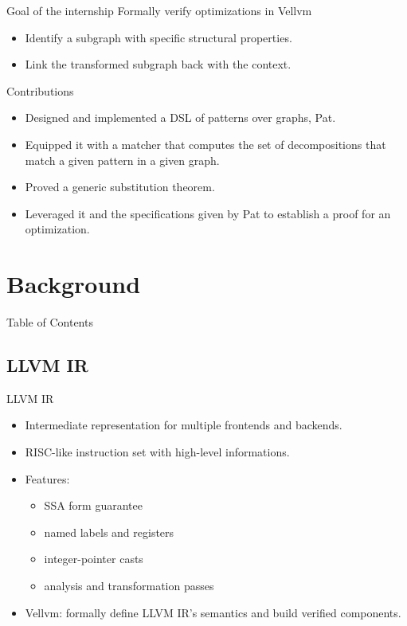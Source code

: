 \documentclass{beamer}
\newcommand{\leon}[1]{\textcolor{blue}{#1}}
\begin{document}
\begin{frame}
  \begin{block}{Goal of the internship}
    Formally verify optimizations in Vellvm
  \end{block}
  \begin{itemize}
    \item Identify a subgraph with specific structural properties.
    \item Link the transformed subgraph back with the context.
  \end{itemize}
\end{frame}

\begin{frame}{Contributions}
  \begin{itemize}
    \item Designed and implemented a DSL of patterns over graphs, Pat.
    \item Equipped it with a matcher that computes the set of decompositions that match a given pattern in a given graph.
    \item Proved a generic substitution theorem.
    \item Leveraged it and the specifications given by Pat to establish a proof for an optimization.
  \end{itemize}
\end{frame}

\section{Background}

\begin{frame}{Table of Contents}
  \tableofcontents[currentsection]
\end{frame}

\subsection*{LLVM IR}

\begin{frame}{LLVM IR}
  \begin{itemize}
    \item Intermediate representation for multiple frontends and backends.
    \item RISC-like instruction set with high-level informations.
    \item Features:\begin{itemize}
            \item SSA form guarantee
            \item named labels and registers
            \item integer-pointer casts
            \item analysis and transformation passes
          \end{itemize}
    \item Vellvm: formally define LLVM IR's semantics and build verified components.
  \end{itemize}
\end{frame}
\end{document}
